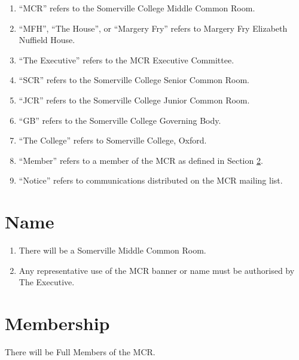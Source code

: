 \documentclass[11pt, a4paper]{article}
\begin{document}
\begin{enumerate}
	\item ``MCR'' refers to the Somerville College Middle Common Room.
    \item ``MFH'', ``The House'', or ``Margery Fry'' refers to Margery Fry Elizabeth Nuffield House.
    \item ``The Executive'' refers to the MCR Executive Committee.
	\item ``SCR'' refers to the Somerville College Senior Common Room.
	\item ``JCR'' refers to the Somerville College Junior Common Room.
	\item ``GB'' refers to the Somerville College Governing Body.
	\item ``The College'' refers to Somerville College, Oxford.
	\item ``Member'' refers to a member of the MCR as defined in Section \ref{sec:membership}.
    \item ``Notice'' refers to communications distributed on the MCR mailing list.
\end{enumerate}





\section{Name}
\label{sec:name}

\begin{enumerate}
	\item There will be a Somerville Middle Common Room.
    \item Any representative use of the MCR banner or name must be authorised by The Executive.
\end{enumerate}





\section{Membership}
\label{sec:membership}

There will be Full Members of the MCR.
\end{document}
